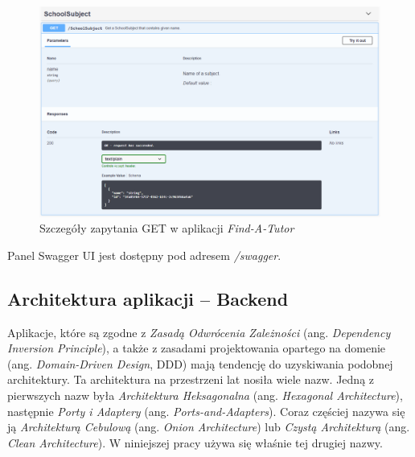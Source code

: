 \documentclass[12pt]{article}
\numberwithin{figure}{section}
\begin{document}
\begin{sloppypar}
\begin{figure}[!htbp] 
    \centering
    \includegraphics[width=.96\textwidth]{images/chapter_3/swagger-get.png}
    \caption{Szczegóły zapytania GET w aplikacji \textit{Find-A-Tutor}}
    \label{fig:swagger-get}
\end{figure}
    
Panel Swagger UI jest dostępny pod adresem \textit{/swagger}.

\subsection{Architektura aplikacji -- Backend}
    
Aplikacje, które są zgodne z \textit{Zasadą Odwrócenia Zależności} (ang. \textit{Dependency Inversion Principle}), a także z zasadami projektowania opartego na domenie (ang. \textit{Domain-Driven Design}, DDD) mają tendencję do uzyskiwania podobnej architektury. Ta architektura na przestrzeni lat nosiła wiele nazw. Jedną z pierwszych nazw była \textit{Architektura Heksagonalna} (ang. \textit{Hexagonal Architecture}), następnie \textit{Porty i Adaptery} (ang. \textit{Ports-and-Adapters}). Coraz częściej nazywa się ją \textit{Architekturą Cebulową} (ang. \textit{Onion Architecture}) lub \textit{Czystą Architekturą} (ang. \textit{Clean Architecture}). W niniejszej pracy używa się właśnie tej drugiej nazwy.


\end{sloppypar}
\end{document}
